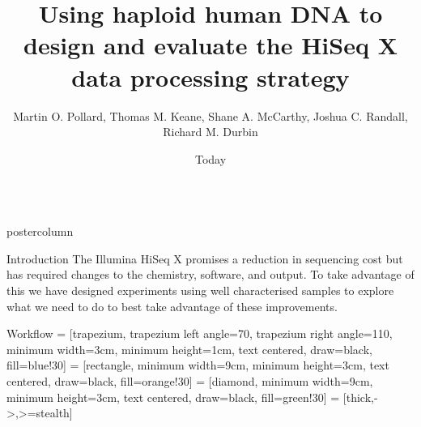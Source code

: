 \documentclass[final,xcolor=table]{beamer}
\title{Using haploid human DNA to design and evaluate the HiSeq X data processing strategy}
\author{Martin O. Pollard, Thomas M. Keane, Shane A. McCarthy, Joshua C. Randall, Richard M. Durbin}
\institute[Wellcome Trust Sanger Institute]{Wellcome Trust Sanger Institute}
\date{Today}
\begin{document}
\begin{frame}{}
    \begin{columns}
    \begin{column}{.49\textwidth}
        \begin{beamercolorbox}[center,wd=\textwidth]{postercolumn}
            \begin{minipage}[T]{.95\textwidth}  %
            \begin{block}{Introduction}
            The Illumina HiSeq X promises a reduction in sequencing cost but has required changes to the chemistry, software, and output.  To take advantage of this we have designed experiments using well characterised samples to explore what we need to do to best take advantage of these improvements. 
            \end{block}
            \begin{block}{Workflow}
                 = [trapezium, trapezium left angle=70, trapezium right angle=110, minimum width=3cm, minimum height=1cm, text centered, draw=black, fill=blue!30]
                 = [rectangle, minimum width=9cm, minimum height=3cm, text centered, draw=black, fill=orange!30]
                 = [diamond, minimum width=9cm, minimum height=3cm, text centered, draw=black, fill=green!30]
                 = [thick,->,>=stealth]
                \centering
\end{block}
\end{minipage}
\end{beamercolorbox}
\end{column}
\end{columns}
\end{frame}
\end{document}
